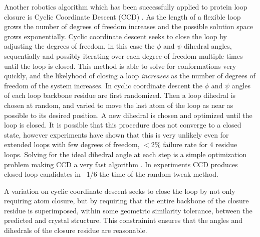 Another robotics algorithm which has been successfully applied to protein loop closure is Cyclic Coordinate Descent (CCD) \cite{canutescu2003cyclic}.
As the length of a flexible loop grows the number of degrees of freedom increases and the possible solution space grows exponentially. 
Cyclic coordinate descent seeks to close the loop by adjusting the degrees of freedom, in this case the $\phi$ and $\psi$ dihedral angles, sequentially and possibly iterating over each degree of freedom multiple times until the loop is closed.
This method is able to solve for conformations very quickly, and the likelyhood of closing a loop {\it increases} as the number of degrees of freedom of the system increases.
In cyclic coordinate descent the $\phi$ and $\psi$ angles of each loop backbone residue are first randomized.
Then a loop dihedral is chosen at random, and varied to move the last atom of the loop as near as possible to its desired position.
A new dihedral is chosen and optimized until the loop is closed.
It is possible that this procedure does not converge to a closed state, however experiments have shown that this is very unlikely even for extended loops with few degrees of freedom, $ < 2\%$ failure rate for 4 residue loops.
Solving for the ideal dihedral angle at each step is a simple optimization problem making CCD a very fast algorithm \cite{wang1991combined,canutescu2003cyclic}.
In experiments CCD produces closed loop candidates in ~1/6 the time of the random tweak method.

A variation on cyclic coordinate descent seeks to close the loop by not only requiring atom closure, but by requiring that the entire backbone of the closure residue is superimposed, within some geometric similarity tolerance, between the predicted and crystal structure.
This constrainint ensures that the angles and dihedrals of the closure residue are reasonable\cite{canutescu2003cyclic}.
